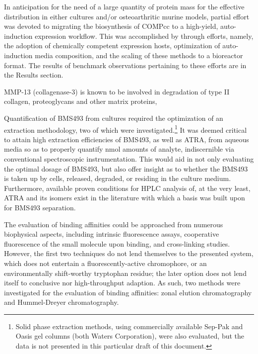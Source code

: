 \begin{refsection}
\begin{description}
\end{description}
In anticipation for the need of a large quantity of protein mass for the
effective distribution in either  cultures and/or 
osteoarthritic murine models, partial effort was devoted to migrating the
biosynthesis of COMPcc to a high-yield, auto-induction expression workflow. This
was accomplished by through efforts, namely, the adoption of 
chemically competent expression hosts, optimization of auto-induction media
composition, and the scaling of these methods to a bioreactor format. The
results of benchmark observations pertaining to these efforts are in the Results
section.

MMP-13 (collagenase-3) is known to be involved in degradation
of type II collagen, proteoglycans and other matrix
proteins,\cite{Flannery2006} 

Quantification of BMS493 from cultures required the optimization of an
extraction methodology, two of which were investigated.\footnote{Solid phase
    extraction methods, using commercially available Sep-Pak  and Oasis
    gel columns (both Waters Corporation), were also evaluated, but the data is
not presented in this particular draft of this document.} It was deemed critical
to attain high extraction efficiencies of BMS493, as well as ATRA, from aqueous
media so as to properly quantify \si{\nano\mol} amounts of analyte,
indiscernible via conventional spectroscopic instrumentation. This would aid in
not only evaluating the optimal dosage of BMS493, but also offer insight as to
whether the BMS493 is taken up by cells, released, degraded, or residing in the
culture medium. Furthermore, available proven conditions for HPLC analysis of, at
the very least, ATRA and its isomers exist in the literature with which a basis
was built upon for BMS493
separation.\cite{Kim2010b,Chauveau-Duriot2010,Schaffer2010a,Kane2008b,DeLeenheer1982,Motto1989} 

The evaluation of binding affinities could be approached from numerous
biophysical aspects, including intrinsic fluorescence assays, cooperative
fluorescence of the small molecule upon binding, and cross-linking studies.
However, the first two techniques do not lend themselves to the presented
system, which does not entertain a fluorescently-active chromophore, or an
environmentally shift-worthy tryptophan residue; the later option does not lend
itself to conclusive nor high-throughput adaption. As such, two methods were
investigated for the evaluation of binding affinities: zonal elution
chromatography and Hummel-Dreyer chromatography.


\end{refsection}
